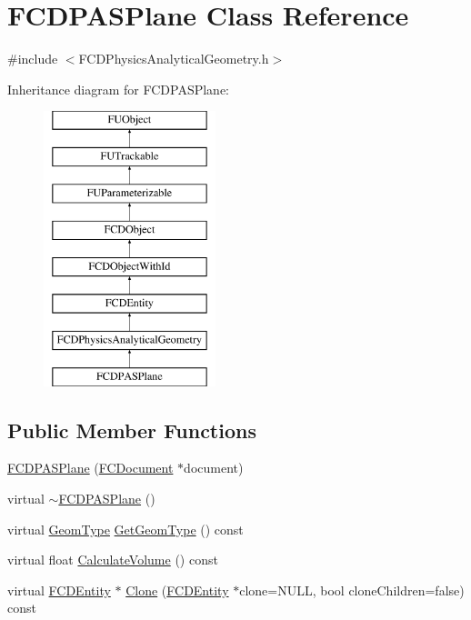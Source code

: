 \hypertarget{classFCDPASPlane}{
\section{FCDPASPlane Class Reference}
\label{classFCDPASPlane}
}


{\ttfamily \#include $<$FCDPhysicsAnalyticalGeometry.h$>$}

Inheritance diagram for FCDPASPlane:\begin{figure}[H]
\begin{center}
\leavevmode
\includegraphics[height=8.000000cm]{classFCDPASPlane}
\end{center}
\end{figure}
\subsection*{Public Member Functions}
\begin{DoxyCompactItemize}
\item 
\hyperlink{classFCDPASPlane_a65438664ddc3091e3060f8e0d7130d47}{FCDPASPlane} (\hyperlink{classFCDocument}{FCDocument} $\ast$document)
\item 
virtual \hyperlink{classFCDPASPlane_a5c1223799ef22e7c3247408bf540b21d}{$\sim$FCDPASPlane} ()
\item 
virtual \hyperlink{classFCDPhysicsAnalyticalGeometry_a511583406e5c6a1bb5bd84c0453a452c}{GeomType} \hyperlink{classFCDPASPlane_a88c6bbffd989b9215b09199c876065ea}{GetGeomType} () const 
\item 
virtual float \hyperlink{classFCDPASPlane_a49e8a7d34eacf41708585e199716728d}{CalculateVolume} () const 
\item 
virtual \hyperlink{classFCDEntity}{FCDEntity} $\ast$ \hyperlink{classFCDPASPlane_aa2d319eebf56f8967dba2cba55df41cb}{Clone} (\hyperlink{classFCDEntity}{FCDEntity} $\ast$clone=NULL, bool cloneChildren=false) const 
\end{DoxyCompactItemize}
